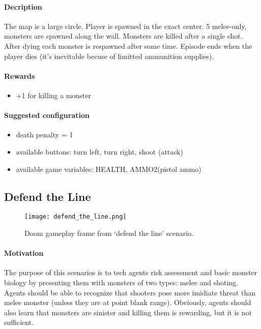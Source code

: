 		\paragraph{Decription}
			The map is a large circle. Player is spawned in the exact center. 5 melee-only, monsters are spawned along the wall. Monsters are killed after a single shot. After dying each monster is respawned after some time. Episode ends when the player dies (it's inevitable becuse of limitted ammunition supplies).

		\paragraph{Rewards}
			\begin{itemize}
				\item +1 for killing a monster
			\end{itemize}
		
		\paragraph{Suggested configuration}
			\begin{itemize}
				\item death penalty = 1
				\item available buttons: turn left, turn right, shoot (attack)
				\item available game variables: HEALTH, AMMO2(pistol ammo)
			\end{itemize}
	\newpage

	\subsection{Defend the Line}
		\begin{figure}
			\centering
			\texttt{[image: defend\_the\_line.png]}
			\caption{Doom gameplay frame from `defend the line' scenario.}\label{fig:defend_the_line}
		\end{figure}
		\paragraph{Motivation} 
			The purpose of this scenarios is to tech agents risk assessment and basic monster biology by presenting them with monsters of two types: melee and shoting. Agents should be able to recognize that shooters pose more imidiate threat than melee monster (unless they are at point blank range). Obviously, agents should also learn that monsters are sinister and killing them is rewarding, but it is not sufficient.
